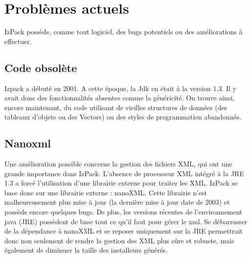 \section{Problèmes actuels}
IzPack possède, comme tout logiciel, des bugs potentiels ou des améliorations à effectuer.
\subsection{Code obsolète}
Izpack a débuté en 2001.
A cette époque, la Jdk en était à la version 1.3. Il y avait donc des fonctionnalités absentes comme la généricité.
On trouve ainsi, encore maintenant, du code utilisant de vieilles structures de données (des tableaux d'objets ou des Vectors) ou des styles de programmation abandonnés.
\subsection{Nanoxml}
Une amélioration possible concerne la gestion des fichiers XML, qui ont une grande importance dans IzPack.
L'absence de processeur XML intégré à la JRE 1.3 a forcé l'utilisation d'une librairie externe pour traiter les XML.
IzPack se base donc sur une librairie externe : nanoXML.
Cette librairie n'est malheureusement plus mise à jour (la dernière mise à jour date de 2003) et possède encore quelques bugs.
De plus, les versions récentes de l'environnement java (JRE) possèdent de base tout ce qu'il faut pour gérer le xml.
Se débarrasser de la dépendance à nanoXML et se reposer uniquement sur la JRE permettrait donc non seulement de rendre la gestion des XML plus sûre et robuste, mais également de diminuer la taille des installeurs générés.